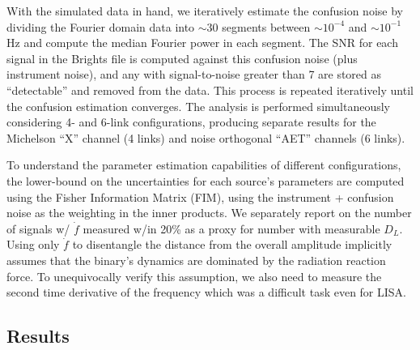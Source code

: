 \documentclass{iopart}
\begin{document}
With the simulated data in hand, we iteratively estimate the confusion noise by dividing the Fourier domain data into $\sim30$ segments between $\sim10^{-4}$ and $\sim10^{-1}$ Hz and compute the median Fourier power in each segment.  The SNR for each signal in the Brights file is computed against this confusion noise (plus instrument noise), and any with signal-to-noise 
greater than 7 are stored as ``detectable'' and removed from the data.  This process is repeated iteratively until the confusion 
estimation converges.  The analysis is performed simultaneously considering 4- and 6-link configurations, producing separate 
results for the Michelson ``X'' channel (4 links) and noise orthogonal ``AET'' channels (6 links).

To understand the parameter estimation capabilities of different configurations, the lower-bound on the uncertainties for each source's parameters are computed using the Fisher Information Matrix (FIM), using the instrument + confusion noise as the weighting in the inner products.  We separately report on the number of  signals w/ $\dot{f}$ measured w/in 20\% as a 
proxy for number with measurable $D_L$.  Using only $\dot{f}$ to disentangle the distance from the overall amplitude 
implicitly assumes that the binary's dynamics are dominated by the radiation reaction force.  To unequivocally verify this assumption, we also need to measure the second time derivative of the frequency which was a difficult task even for LISA.  

\subsection{Results}
\end{document}

